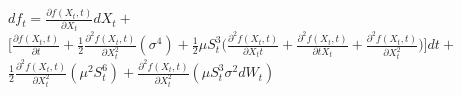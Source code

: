 \documentclass[12pt]{article}
\begin{document}
\begin{center}
${df_t =   \frac{\partial f(X_t,t)}{\partial X_t}dX_t+}$
${\Big[\frac{\partial f(X_t,t)}{\partial t} + \frac{1}{2}\frac{\partial^2 f(X_t,t)}{\partial X_t^2}(\sigma^{4})+\frac{1}{2}\mu S_t^{3}\Big(\frac{\partial^2 f(X_t,t)}{\partial X_t t}+\frac{\partial^2 f(X_t,t)}{\partial t X_t}+\frac{\partial^2 f(X_t,t)}{\partial X_t^2}\Big)\Big]dt+}$\\
${\frac{1}{2}\frac{\partial^2 f(X_t,t)}{\partial X_t^2}(\mu^2 S_t^{6}) + 
\frac{\partial^2 f(X_t,t)}{\partial X_t^2}(\mu S_t^{3}\sigma^{2}dW_t)}$

\end{center}



% 
% 
\end{document}
